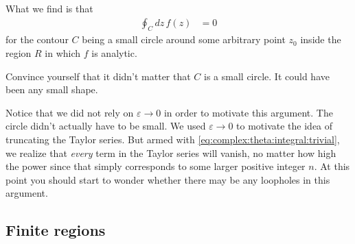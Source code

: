 What we find is that 
\begin{align}
  \oint_C dz\, f(z) &= 0
\end{align}
for the contour $C$ being a small circle around some arbitrary point $z_0$ inside the region $R$ in which $f$ is analytic. 
\begin{exercise}
Convince yourself that it didn't matter that $C$ is a small circle. It could have been any small shape. 
\end{exercise}
Notice that we did not rely on $\varepsilon\to 0$ in order to motivate this argument. The circle didn't actually have to be small. We used $\varepsilon\to 0$ to motivate the idea of truncating the Taylor series. But armed with \eqref{eq:complex:theta:integral:trivial}, we realize that \emph{every} term in the Taylor series will vanish, no matter how high the power since that simply corresponds to some larger positive integer $n$. At this point you should start to wonder whether there may be any loopholes in this argument.




\subsection{Finite regions}

